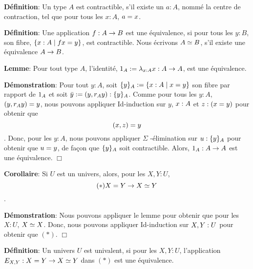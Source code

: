 \documentclass{article}
\begin{document}
 
 
 \textbf{Définition}:
 Un type $A$ est contractible, s'il existe un $a : A$, nommé la centre de contraction, tel que pour tous les $x : A$, $a = x$.
 
 \textbf{Définition}:
 Une application $f : A \rightarrow B$ est une équivalence, si pour tous les $y : B$, son fibre, $\{ x : A \mid f x = y \}$, est contractible.
 Nous écrivons $A \simeq B$, s'il existe une équivalence $A \rightarrow B$.
 
 \textbf{Lemme}:
 Pour tout type $A$, l'identité, $1_{ A } := \lambda_{x : A} x : A \rightarrow A$, est une équivalence.
 
 \textbf{Démonstration}:
 Pour tout $y : A$, soit $\{ y \}_{ A } := \{ x : A \mid x = y \}$ son fibre par rapport de $1_{ A }$ et soit $\bar{ y } := ( y , r_{ A } y ) : \{ y \}_{ A }$.
 Comme pour tous les $y : A$, $( y , r_{ A } y ) = y$, nous pouvons appliquer Id-induction sur $y$, $x : A$ et $z : ( x = y )$ pour obtenir que \[( x , z ) = y\].
 Donc, pour les $y : A$, nous pouvons appliquer $\Sigma$ -élimination sur $u : \{ y \}_{ A }$ pour obtenir que $u = y$, de façon que $\{ y \}_{ A }$ soit contractible.
 Alors, $1_{ A } : A \rightarrow A$ est une équivalence.
  $\Box$ 
 
 \textbf{Corollaire}:
 Si $U$ est un univers, alors, pour les $X , Y : U$, \[(*)X = Y \rightarrow X \simeq Y\].
 
 \textbf{Démonstration}:
 Nous pouvons appliquer le lemme pour obtenir que pour les $X : U$, $X \simeq X$.
 Donc, nous pouvons appliquer Id-induction sur $X , Y : U$ pour obtenir que $(*)$.
  $\Box$ 
 
 
 \textbf{Définition}:
 Un univers $U$ est univalent, si pour les $X , Y : U$, l'application $E_ { X , Y }: X = Y \rightarrow X \simeq Y$ dans $(*)$ est une équivalence.
 
 
\end{document}
